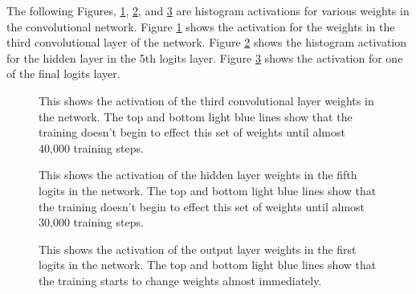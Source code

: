 \documentclass[12pt,twocolumn,letterpaper]{article}
\begin{document}
The following Figures, \ref{fig:conv}, \ref{fig:hidden}, and \ref{fig:logits}
are histogram activations for various 
weights in the convolutional network. Figure \ref{fig:conv} shows the activation for the 
weights in the third convolutional layer of the network. Figure \ref{fig:hidden} shows the 
histogram activation for the hidden layer in the 5th logits layer. Figure \ref{fig:logits} 
shows the activation for one of the final logits layer. 

\begin{figure}[t]
\begin{center}
\end{center}
   \caption{This shows the activation of the third convolutional layer weights in 
   the network. The top and bottom light blue lines show that the training doesn't 
   begin to effect this set of weights until almost 40,000 training steps.}
\label{fig:conv}
\end{figure}

\begin{figure}[t]
\begin{center}
\end{center}
   \caption{This shows the activation of the hidden layer weights in the fifth logits in 
   the network. The top and bottom light blue lines show that the training doesn't 
   begin to effect this set of weights until almost 30,000 training steps.}
\label{fig:hidden}
\end{figure}

\begin{figure}[t]
\begin{center}
\end{center}
   \caption{This shows the activation of the output layer weights in the first logits in 
   the network. The top and bottom light blue lines show that the training starts to change 
   weights almost immediately.}
\label{fig:logits}
\end{figure}
\end{document}

